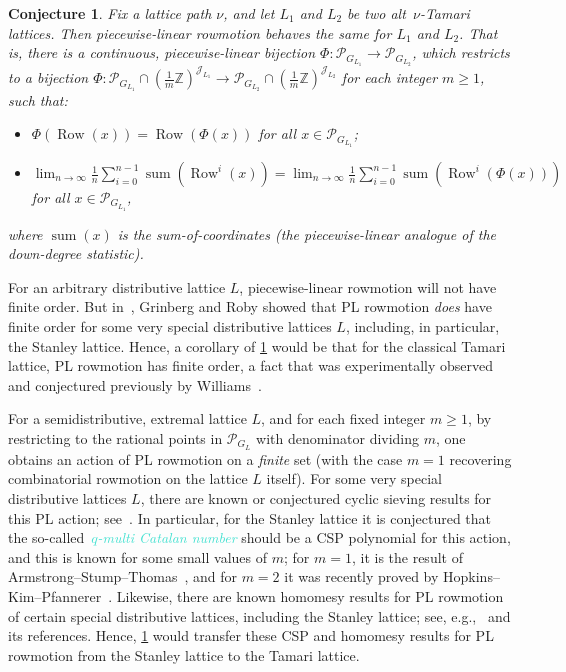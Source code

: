 \documentclass[11pt]{amsart}
\DeclareMathOperator{\row}{Row}
\newcommand{\dfn}[1]{\textcolor{Turquoise}{\emph{#1}}}
\newtheorem{conjecture}[theorem]{Conjecture}
\theoremstyle{definition}
\begin{document}
\begin{conjecture} \label{conj:pl}
Fix a lattice path $\nu$, and let $L_1$ and $L_2$ be two alt~$\nu$-Tamari lattices. Then piecewise-linear rowmotion behaves the same for $L_1$ and $L_2$. That is, there is a continuous, piecewise-linear bijection $\Phi\colon \mathcal{P}_{G_{L_1}} \to \mathcal{P}_{G_{L_2}}$, which restricts to a bijection $\Phi\colon \mathcal{P}_{G_{L_1}} \cap (\frac{1}{m}\mathbb{Z})^{\mathcal{J}_{L_1}} \to \mathcal{P}_{G_{L_2}} \cap (\frac{1}{m}\mathbb{Z})^{\mathcal{J}_{L_2}}$ for each integer $m \geq 1$, such that:
\begin{itemize}
\item $\Phi(\row(x)) = \row(\Phi(x))$ for all $x\in \mathcal{P}_{G_{L_1}}$;
\item $\lim_{n\to\infty} \frac{1}{n} \sum_{i=0}^{n-1} \operatorname{sum}(\row^i(x))=\lim_{n\to\infty} \frac{1}{n} \sum_{i=0}^{n-1} \operatorname{sum}(\row^i(\Phi(x)))$ for all $x\in \mathcal{P}_{G_{L_1}}$,
\end{itemize}
where $\operatorname{sum}(x)$ is the sum-of-coordinates (the piecewise-linear analogue of the down-degree statistic).
\end{conjecture}

For an arbitrary distributive lattice $L$, piecewise-linear rowmotion will not have finite order. But in~\cite{grinberg2015birational}, Grinberg and Roby showed that PL rowmotion \emph{does} have finite order for some very special distributive lattices $L$, including, in particular, the Stanley lattice. Hence, a corollary of \cref{conj:pl} would be that for the classical Tamari lattice, PL rowmotion has finite order, a fact that was experimentally observed and conjectured previously by Williams~\cite{williams2020personal}.

For a semidistributive, extremal lattice $L$, and for each fixed integer $m \geq 1$, by restricting to the rational points in $\mathcal{P}_{G_L}$ with denominator dividing $m$, one obtains an action of PL rowmotion on a \emph{finite} set (with the case $m=1$ recovering combinatorial rowmotion on the lattice $L$ itself). For some very special distributive lattices $L$, there are known or conjectured cyclic sieving results for this PL action; see~\cite{hopkins2020cyclic,hopkins2024order}. In particular, for the Stanley lattice it is conjectured that the so-called~\dfn{$q$-multi Catalan number} should be a CSP polynomial for this action, and this is known for some small values of $m$; for $m=1$, it is the result of Armstrong--Stump--Thomas~\cite{armstrong2013uniform}, and for $m=2$ it was recently proved by Hopkins--Kim--Pfannerer~\cite{hopkins2026cyclic}. Likewise, there are known homomesy results for PL rowmotion of certain special distributive lattices, including the Stanley lattice; see, e.g.,~\cite{defant2023homomesy} and its references. Hence, \cref{conj:pl} would transfer these CSP and homomesy results for PL rowmotion from the Stanley lattice to the Tamari lattice.
\end{document}
